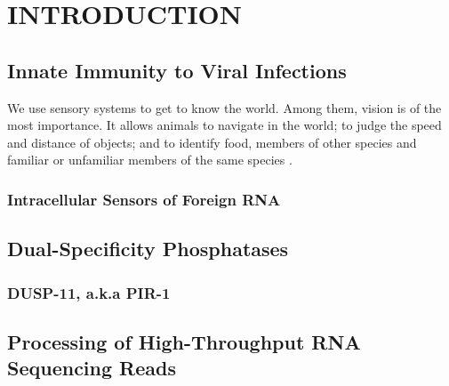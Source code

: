 \chapter{INTRODUCTION}
\newpage

\section{Innate Immunity to Viral Infections}
We use sensory systems to get to know the world. Among them, vision is of the most importance. It allows animals to navigate in the world; to judge the speed and distance of objects; and to identify food, members of other species and familiar or unfamiliar members of the same species \cite{Squire2003}.

\subsection{Intracellular Sensors of Foreign RNA}

\section{Dual-Specificity Phosphatases}

\subsection{DUSP-11, a.k.a PIR-1}

\section{Processing of High-Throughput RNA Sequencing Reads}

